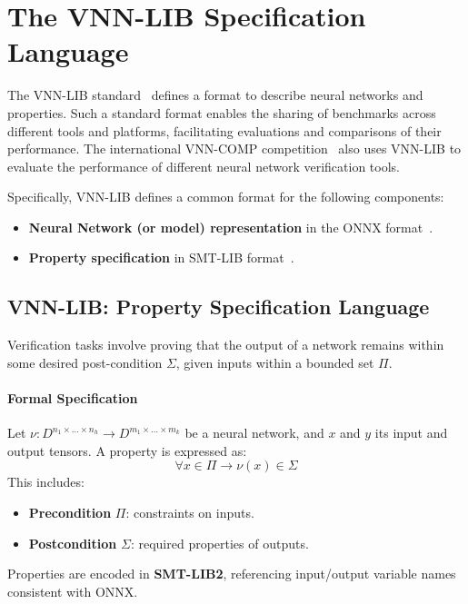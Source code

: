 \documentclass[oneside,11pt,dvipsnames]{book}
\numberwithin{equation}{section}
\theoremstyle{definition}
\theoremstyle{remark}
\begin{document}
\section{The VNN-LIB  Specification Language}


The VNN-LIB standard~\cite{demarchi2023supporting,vnnlib} defines a format to describe neural networks and properties. Such a standard format enables the sharing of benchmarks across different tools and platforms, facilitating evaluations and comparisons of their performance. The international VNN-COMP competition~\cite{brix2024fifth} also uses VNN-LIB to evaluate the performance of different neural network verification tools.


Specifically, VNN-LIB defines a common format for the following components:
\begin{itemize}
    \item \textbf{Neural Network (or model) representation} in the ONNX format~\cite{onnx}.
    \item \textbf{Property specification} in SMT-LIB format~\cite{barrett2010smt}.
\end{itemize}



\subsection{VNN-LIB: Property Specification Language}

Verification tasks involve proving that the output of a network remains within some desired post-condition $\Sigma$, given inputs within a bounded set $\Pi$.

\paragraph{Formal Specification}
Let $\nu: D^{n_1 \times \dots \times n_h} \to D^{m_1 \times \dots \times m_k}$ be a neural network, and $x$ and $y$ its input and output tensors. A property is expressed as:
\[
\forall x \in \Pi \rightarrow \nu(x) \in \Sigma
\]
This includes:
\begin{itemize}
    \item \textbf{Precondition} $\Pi$: constraints on inputs.
    \item \textbf{Postcondition} $\Sigma$: required properties of outputs.
\end{itemize}

Properties are encoded in \textbf{SMT-LIB2}, referencing input/output variable names consistent with ONNX.
\end{document}
